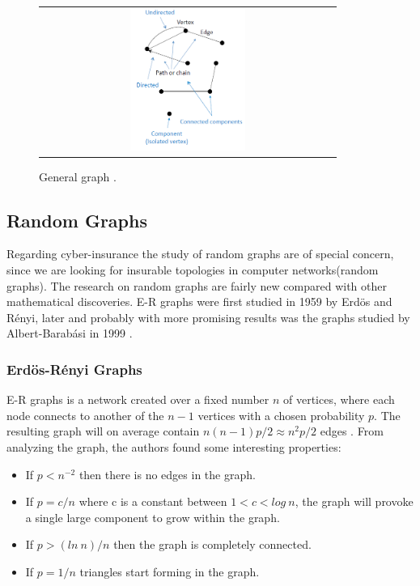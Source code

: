 \begin{figure}[h]
\centering
\begin{tabular}{@{}c@{}}
\includegraphics[width=0.4\textwidth]{../Figures/generalGraph.png}
\end{tabular}
\caption{\label{fig:generalGraph} General graph \cite{audestad}.}
\end{figure}


\subsection{Random Graphs}

Regarding cyber-insurance the study of random graphs are of special concern, since we are looking for insurable topologies in computer networks(random graphs). The research on random graphs are fairly new compared with other mathematical discoveries. E-R graphs were first studied in 1959 by Erdös and Rényi, later and probably with more promising results was the graphs studied by Albert-Barabási in 1999 \cite{audestad}. 

\subsubsection{Erdös-Rényi Graphs}
E-R graphs is a network created over a fixed number $n$ of vertices, where each node connects to another of the $n-1$ vertices with a chosen 
probability $p$. The resulting graph will on average contain $n(n-1)p/2 \approx n^{2}p/2$ edges \cite{barabasi}. 
From analyzing the graph, the authors found some interesting properties\cite{barabasi}\cite{audestad}:

\begin{itemize}
\item If $p<n^{-2}$  then there is no edges in the graph. 
\item If $p=c/n$ where c is a constant between $1 < c < log\: n$, the graph will provoke a single large component to grow within the graph.
\item If $p>(ln\: n)/n$ then the graph is completely connected. 
\item If $p = 1/n$ triangles start forming in the graph. 
\end{itemize}

